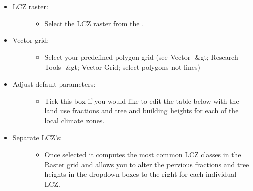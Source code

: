 \documentclass[letterpaper,10pt,english]{sphinxmanual}
\begin{document}
\begin{itemize}
\item {} \begin{description}
\item[{LCZ raster:}] \leavevmode\begin{itemize}
\item {} 
Select the LCZ raster from the .

\end{itemize}

\end{description}

\item {} \begin{description}
\item[{Vector grid:}] \leavevmode\begin{itemize}
\item {} 
Select your predefined polygon grid (see Vector -\&gt; Research Tools -\&gt; Vector Grid; select polygons not lines)

\end{itemize}

\end{description}

\item {} \begin{description}
\item[{Adjust default parameters:}] \leavevmode\begin{itemize}
\item {} 
Tick this box if you would like to edit the table below with the land use fractions and tree and building heights for each of the local climate zones.

\end{itemize}

\end{description}

\item {} \begin{description}
\item[{Separate LCZ’s:}] \leavevmode\begin{itemize}
\item {} 
Once selected it computes the most common LCZ classes in the Raster grid and allows you to alter the pervious fractions and tree heights in the dropdown boxes to the right for each individual LCZ.

\end{itemize}

\end{description}

\end{itemize}
\end{document}
